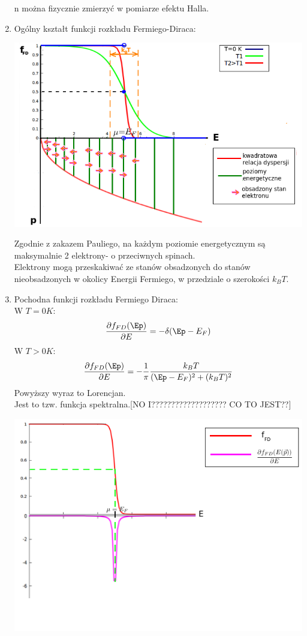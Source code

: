 \begin{enumerate}
n można fizycznie zmierzyć w pomiarze efektu Halla.
\item Ogólny kształt funkcji rozkładu Fermiego-Diraca:
\begin{center}\includegraphics[scale=0.75]{obrazki/wykl_7_obrazek4.png}\end{center}
Zgodnie z zakazem Pauliego, na każdym poziomie energetycznym są maksymalnie 2 elektrony- o przeciwnych spinach.\\
Elektrony mogą przeskakiwać ze stanów obsadzonych do stanów nieobsadzonych w  okolicy Energii Fermiego, w przedziale o szerokości $k_BT$.
\item Pochodna funkcji rozkładu Fermiego Diraca:\\
W $T=0 K$:
\begin{equation}\frac{\partial f_{FD}(\Ep)}{\partial E}=-\delta(\Ep-E_F)\end{equation}
W $T>0 K$:
\begin{equation}\frac{\partial f_{FD}(\Ep)}{\partial E}=-\frac{1}{\pi}\frac{k_BT}{(\Ep-E_F)^2+(k_BT)^2}\end{equation}
Powyższy wyraz to Lorencjan. \\
Jest to tzw. funkcja spektralna.[NO I??????????????????? CO TO JEST??]
\begin{center}\includegraphics[scale=0.5]{obrazki/wykl_7_obrazek5.png}\end{center}
\end{enumerate}
